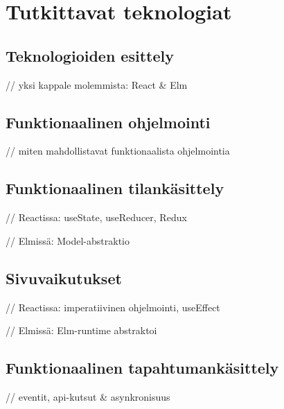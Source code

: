 \chapter{Tutkittavat teknologiat}

\section{Teknologioiden esittely}

// yksi kappale molemmista: React \& Elm

\section{Funktionaalinen ohjelmointi}

// miten mahdollistavat funktionaalista ohjelmointia

\section{Funktionaalinen tilankäsittely}

// Reactissa: useState, useReducer, Redux

// Elmissä: Model-abstraktio

\section{Sivuvaikutukset}

// Reactissa: imperatiivinen ohjelmointi, useEffect

// Elmissä: Elm-runtime abstraktoi

\section{Funktionaalinen tapahtumankäsittely}

// eventit, api-kutsut \& asynkronisuus
